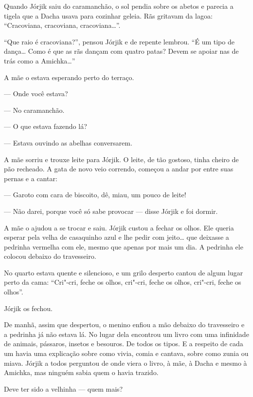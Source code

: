Quando Jórjik saiu do caramanchão, o sol pendia sobre os abetos e
parecia a tigela que a Dacha usava para cozinhar geleia. Rãs gritavam da
lagoa: ``Cracoviana, cracoviana, cracoviana\ldots{}''.

``Que raio é cracoviana?'', pensou Jórjik e de repente lembrou. ``É um tipo de dança\ldots{} Como é que as rãs dançam com quatro patas? Devem se
apoiar nas de trás como a Amichka\ldots{}''

A mãe o estava esperando perto do terraço.

--- Onde você estava?

--- No caramanchão.

--- O que estava fazendo lá?

--- Estava ouvindo as abelhas conversarem.

A mãe sorriu e trouxe leite para Jórjik. O leite, de tão gostoso, tinha
cheiro de pão recheado. A gata de novo veio correndo, começou a andar
por entre suas pernas e a cantar:

--- Garoto com cara de biscoito, dê, miau, um pouco de leite!

--- Não darei, porque você só sabe provocar --- disse Jórjik e foi
dormir.

A mãe o ajudou a se trocar e saiu. Jórjik custou a fechar os olhos. Ele
queria esperar pela velha de casaquinho azul e lhe pedir com jeito\ldots{}
que deixasse a pedrinha vermelha com ele, mesmo que apenas por mais um
dia. A pedrinha ele colocou debaixo do travesseiro.

No quarto estava quente e silencioso, e um grilo desperto cantou de
algum lugar perto da cama: ``Cri"-cri, feche os olhos, cri"-cri, feche os
olhos, cri"-cri, feche os olhos''.

Jórjik os fechou.

De manhã, assim que despertou, o menino enfiou a mão debaixo do
travesseiro e a pedrinha já não estava lá. No lugar dela encontrou um
livro com uma infinidade de animais, pássaros, insetos e besouros. De
todos os tipos. E a respeito de cada um havia uma explicação sobre como
vivia, comia e cantava, sobre como zunia ou miava. Jórjik a todos
perguntou de onde viera o livro, à mãe, à Dacha e mesmo à Amichka, mas
ninguém sabia quem o havia trazido.

Deve ter sido a velhinha --- quem mais?

